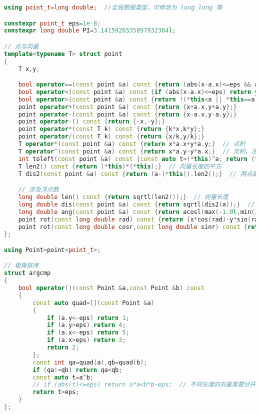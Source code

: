 \documentclass[a4paper]{book}
\begin{document}
\fi
\begin{lstlisting}[language=c++]
using point_t=long double;  //全局数据类型，可修改为 long long 等

constexpr point_t eps=1e-8;
constexpr long double PI=3.1415926535897932384l;

// 点与向量
template<typename T> struct point
{
    T x,y;

    bool operator==(const point &a) const {return (abs(x-a.x)<=eps && abs(y-a.y)<=eps);}
    bool operator<(const point &a) const {if (abs(x-a.x)<=eps) return y<a.y-eps; return x<a.x-eps;}
    bool operator>(const point &a) const {return !(*this<a || *this==a);}
    point operator+(const point &a) const {return {x+a.x,y+a.y};}
    point operator-(const point &a) const {return {x-a.x,y-a.y};}
    point operator-() const {return {-x,-y};}
    point operator*(const T k) const {return {k*x,k*y};}
    point operator/(const T k) const {return {x/k,y/k};}
    T operator*(const point &a) const {return x*a.x+y*a.y;}  // 点积
    T operator^(const point &a) const {return x*a.y-y*a.x;}  // 叉积，注意优先级
    int toleft(const point &a) const {const auto t=(*this)^a; return (t>eps)-(t<-eps);}  // to-left 测试
    T len2() const {return (*this)*(*this);}  // 向量长度的平方
    T dis2(const point &a) const {return (a-(*this)).len2();}  // 两点距离的平方

    // 涉及浮点数
    long double len() const {return sqrtl(len2());}  // 向量长度
    long double dis(const point &a) const {return sqrtl(dis2(a));}  // 两点距离
    long double ang(const point &a) const {return acosl(max(-1.0l,min(1.0l,((*this)*a)/(len()*a.len()))));}  // 向量夹角
    point rot(const long double rad) const {return {x*cos(rad)-y*sin(rad),x*sin(rad)+y*cos(rad)};}  // 逆时针旋转（给定角度）
    point rot(const long double cosr,const long double sinr) const {return {x*cosr-y*sinr,x*sinr+y*cosr};}  // 逆时针旋转（给定角度的正弦与余弦）
};

using Point=point<point_t>;

// 极角排序
struct argcmp
{
    bool operator()(const Point &a,const Point &b) const
    {
        const auto quad=[](const Point &a)
        {
            if (a.y<-eps) return 1;
            if (a.y>eps) return 4;
            if (a.x<-eps) return 5;
            if (a.x>eps) return 3;
            return 2;
        };
        const int qa=quad(a),qb=quad(b);
        if (qa!=qb) return qa<qb;
        const auto t=a^b;
        // if (abs(t)<=eps) return a*a<b*b-eps;  // 不同长度的向量需要分开
        return t>eps;
    }
};


\end{lstlisting}
\end{document}
